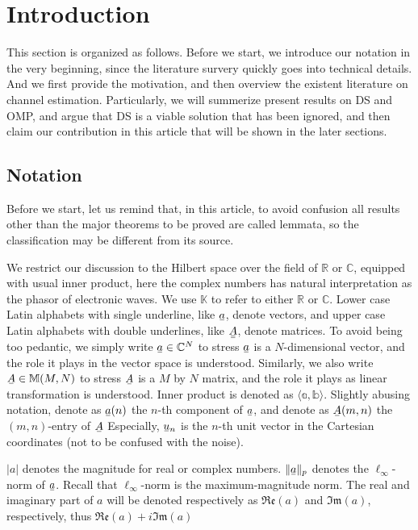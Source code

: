 \documentclass[12pt]{article}
\newcommand{\MB}[1]{\mathbb{#1}}
\newcommand{\MF}[1]{\mathfrak{#1}}
\newcommand{\V}[1]{\stackunder[1.2pt]{$#1$}{\rule{.9ex}{.075ex}}}
\newcommand{\M}[1]{\V{\V{#1}}}
\newcommand{\LA}{\langle}
\newcommand{\RA}{\rangle}
\begin{document}
\section{Introduction}

This section is organized as follows.
Before we start, we introduce our notation in the very beginning, since the literature survery quickly goes into technical details.
And we first provide the motivation, and then overview the existent literature on channel estimation.
Particularly, we will summerize present results on DS and OMP, and argue that DS is a viable solution that has been ignored, and then claim our contribution in this article that will be shown in the later sections.

\subsection{Notation}

Before we start, let us remind that, in this article, to avoid confusion all results other than the major theorems to be proved are called lemmata, so the classification may be different from its source.

We restrict our discussion to the Hilbert space over the field of \(\MB{R}\) or \(\MB{C}\), equipped with usual inner product, here the complex numbers has natural interpretation as the phasor of electronic waves.
We use \(\MB{K}\) to refer to either \(\MB{R}\) or \(\MB{C}\).
Lower case Latin alphabets with single underline, like \(\V{a}\), denote vectors, and upper case Latin alphabets with double underlines, like \(\M{A}\), denote matrices.
To avoid being too pedantic, we simply write \(\V{a} \in \MB{C}^N\) to stress \(\V{a}\) is a \(N\)-dimensional vector, and the role it plays in the vector space is understood.
Similarly, we also write \(\V{A} \in \MB{M}(M,N)\) to stress \(\V{A}\) is a \(M\) by \(N\) matrix, and the role it plays as linear transformation is understood.
Inner product is denoted as \(\LA \MB{a}, \MB{b} \RA\).
Slightly abusing notation, denote as \(\V{a}(n)\) the \(n\)-th component of \(\V{a}\), and denote as \(\V{A}(m,n)\) the \((m,n)\)-entry of \(\V{A}\)
Especially, \(\V{u}_n\) is the \(n\)-th unit vector in the Cartesian coordinates (not to be confused with the noise).

\(|a|\) denotes the magnitude for real or complex numbers.
\(\|\V{a}\|_p\) denotes the \(\ell_\infty\)-norm of \(\V{a}\).
Recall that \(\ell_\infty\)-norm is the maximum-magnitude norm.
The real and imaginary part of \(a\) will be denoted respectively as \(\MF{Re}(a)\) and \(\MF{Im}(a)\), respectively, thus \(\MF{Re}(a) +i \MF{Im}(a)\)
\end{document}
